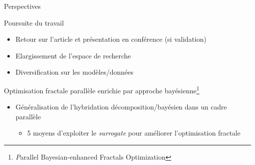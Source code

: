 
\begin{frame}{Perspectives}

    \begin{block}{Poursuite du travail}
        \begin{itemize}
            \item Retour sur l'article et présentation en conférence (si validation)
            \item Elargissement de l'espace de recherche
            \item Diversification sur les modèles/données
        \end{itemize}                
    \end{block}


    \begin{block}{Optimisation fractale parallèle enrichie par approche bayésienne\footnote[6]{\textit Parallel Bayesian-enhanced Fractals Optimization}}

        \begin{itemize}
            \item Généralisation de l'hybridation décomposition/bayésien dans un cadre parallèle
            \begin{itemize}
                \setlength{\itemindent}{5pt}
                \item 5 moyens d'exploiter le \textit{surrogate} pour améliorer l'optimisation fractale
            \end{itemize}
        \end{itemize}
    \end{block}

\end{frame}